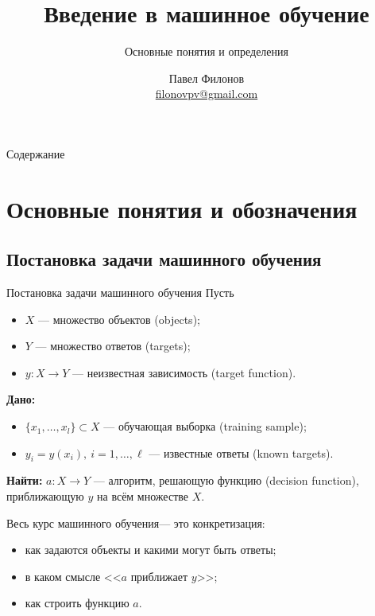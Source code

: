 \documentclass{beamer}
\author{Павел Филонов \\ \href{mailto:filonovpv@gmail.com}{filonovpv@gmail.com}}
\title{Введение в машинное обучение}
\subtitle{Основные понятия и определения}
\begin{document}
\begin{frame}[plain]
    \titlepage
\end{frame}
\begin{frame}[plain]{Содержание}
  \tableofcontents
\end{frame}
\section{Основные понятия и обозначения}
\subsection{Постановка задачи машинного обучения}
\begin{frame}{Постановка задачи машинного обучения}
Пусть
    \begin{itemize}
        \item $X$ --- множество объектов (objects);
        \item $Y$ --- множество ответов (targets);
        \item $y: X \rightarrow Y$ --- неизвестная зависимость (target function).
    \end{itemize}
    {\bf Дано:}
    \begin{itemize}
        \item $\{x_1, \dots, x_l\} \subset X$ --- обучающая выборка (training sample);
        \item $y_i = y(x_i),~ i=1,\dots, \ell$ --- известные ответы (known targets).
    \end{itemize}
    {\bf Найти:}
    $a: X \rightarrow Y$ --- алгоритм, решающую функцию (decision function), приближающую $y$ на всём множестве $X$.


Весь курс машинного обучения--- это конкретизация:
    \begin{itemize}
        \item как задаются объекты и какими могут быть ответы;
        \item в каком смысле <<$a$ приближает $y$>>;
        \item как строить функцию $a$.
    \end{itemize}

\end{frame}
\end{document}
